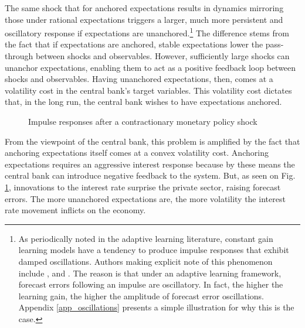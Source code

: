 \documentclass[11pt]{article}
\def \myFigPath {../../figures/}
\renewcommand{\[}{\begin{equation}}
\renewcommand{\]}{\end{equation}}
\def\mySmallFigScale{0.22}
\def\fignameIRFanchored{RIR_anch_psi_pi1_5_command_IRFs_approx_pretty_2020_09_17}
\def\fignameIRFunanchored{RIR_unanch_psi_pi1_5_command_IRFs_approx_pretty_2020_09_17}
\begin{document}
The same shock that for anchored expectations results in dynamics mirroring those under rational expectations triggers a larger, much more persistent and oscillatory response if expectations are unanchored.\footnote{As periodically noted in the adaptive learning literature, constant gain learning models have a tendency to produce impulse responses that exhibit damped oscillations. Authors making explicit note of this phenomenon include \cite{evans_honkapohja2001}, \cite{evans2013bayesian} and \cite{anufriev2012evolutionary}. The reason is that under an adaptive learning framework, forecast errors following an impulse are oscillatory.  In fact, the higher the learning gain, the higher the amplitude of forecast error oscillations. Appendix \ref{app_oscillations} presents a simple illustration for why this is the case.} The difference stems from the fact that if expectations are anchored, stable expectations lower the pass-through between shocks and observables. However, sufficiently large shocks can unanchor expectations, enabling them to act as a positive feedback loop between shocks and observables. Having unanchored expectations, then, comes at a volatility cost in the central bank's target variables. This volatility cost dictates that, in the long run, the central bank wishes to have expectations anchored. 

\begin{figure}[h!]
\caption{Impulse responses after a contractionary monetary policy shock}
\label{IRF_main}
\end{figure}

From the viewpoint of the central bank, this problem is amplified by the fact that anchoring expectations itself comes at a convex volatility cost. Anchoring expectations requires an aggressive interest response because by these means the central bank can introduce negative feedback to the system. But, as seen on Fig. \ref{IRF_main}, innovations to the interest rate surprise the private sector, raising forecast errors. The more unanchored expectations are, the more volatility the interest rate movement inflicts on the economy.
\end{document}
